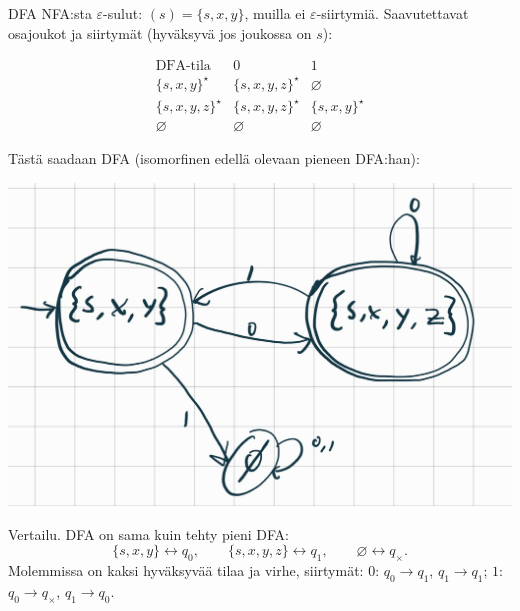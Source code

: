\documentclass[12pt,a4paper]{article}
\begin{document}
\begin{kohta}
\pagebreak

\item DFA NFA:sta 
$\varepsilon$-sulut: $(s)=\{s,x,y\}$, muilla ei $\varepsilon$-siirtymiä.
Saavutettavat osajoukot ja siirtymät (hyväksyvä jos joukossa on $s$):

\[
\renewcommand{\arraystretch}{1.15}
\begin{array}{c|cc}
\text{DFA-tila} & 0 & 1\\\hline
\{s,x,y\}^\star     & \{s,x,y,z\}^\star & \varnothing \\
\{s,x,y,z\}^\star   & \{s,x,y,z\}^\star & \{s,x,y\}^\star \\
\varnothing         & \varnothing       & \varnothing
\end{array}
\]

\noindent Tästä saadaan DFA (isomorfinen edellä olevaan pieneen DFA:han):

\begin{center}
  \includegraphics[width=.4\textwidth]{viikko4tehtävä2_3.jpg}
\end{center}



\item Vertailu. DFA on sama kuin tehty pieni DFA:
\[
\{s,x,y\}\leftrightarrow q_0,\qquad
\{s,x,y,z\}\leftrightarrow q_1,\qquad
\varnothing\leftrightarrow q_\times.
\]
Molemmissa on kaksi hyväksyvää tilaa ja virhe, siirtymät:
$0$: $q_0\!\to\!q_1$, $q_1\!\to\!q_1$; \quad
$1$: $q_0\!\to\!q_\times$, $q_1\!\to\!q_0$.
\end{kohta}
\end{document}
